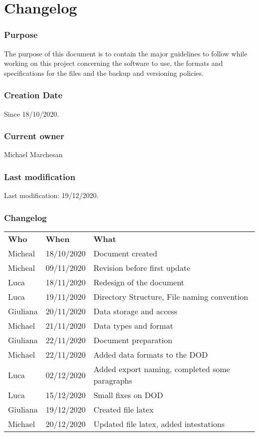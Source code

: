 \section{Changelog}

\subsubsection{Purpose}
The purpose of this document is to contain the major guidelines to follow while working on this project concerning the software to use, the formats and specifications for the files and the backup and versioning policies.

\subsubsection{Creation Date}
Since 18/10/2020.\\

\subsubsection{Current owner}
Michael Marchesan

\subsubsection{Last modification}
Last modification: 19/12/2020.

\subsubsection{Changelog}
\begin{longtable}{ m{2cm}m{3cm}m{8cm}} 
\centering 
 \textbf{Who}& \textbf{When} & \textbf{What}\\
Micheal  & 18/10/2020 & Document created \\
Micheal  & 09/11/2020 & Revision before first update \\
Luca     & 18/11/2020 & Redesign of the document \\
Luca     & 19/11/2020 & Directory Structure, File naming convention \\
Giuliana & 20/11/2020 & Data storage and access \\
Michael  & 21/11/2020 & Data types and format  \\
Giuliana & 22/11/2020 & Document preparation \\
Michael  & 22/11/2020 & Added data formats to the DOD \\
Luca     & 02/12/2020 & Added export naming, completed some paragraphs \\
Luca     & 15/12/2020 & Small fixes on DOD\\
Giuliana & 19/12/2020 & Created file latex \\
Michael  & 20/12/2020 & Updated file latex, added intestations \\

\end{longtable}

\pagebreak
